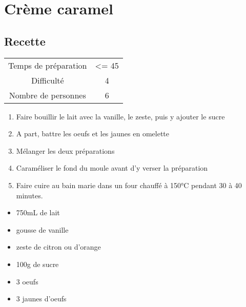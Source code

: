 \newpage
\section{Crème caramel}
    \label{sec:Crème caramel}
    \subsection{Recette}
    \vspace{1cm}


    \begin{center}
        \begin{tabular}{c|c}
            Temps de préparation & <= 45 \\
            Difficulté & 4 \\
            Nombre de personnes & 6 
        \end{tabular}
    \end{center}{}

    \vspace{1cm}
    \hline
    \vspace{1cm}

    \begin{minipage}{.7\textwidth}
        \begin{enumerate}
            \item Faire bouillir le lait avec la vanille, le zeste, puis y ajouter le sucre
	    \item A part, battre les oeufs et les jaunes en omelette
	    \item Mélanger les deux préparations
	    \item Caraméliser le fond du moule avant d'y verser la préparation
	    \item Faire cuire au bain marie dans un four chauffé à 150°C pendant 30 à 40 minutes.

        \end{enumerate}
    \end{minipage}
    \begin{minipage}{.3\textwidth}
        \begin{flushleft}
        \begin{itemize}
            \item 750mL de lait
	    \item gousse de vanille
	    \item zeste de citron ou d'orange
	    \item 100g de sucre
	    \item 3 oeufs
	    \item 3 jaunes d'oeufs

        \end{itemize}
        \end{flushleft}
    \end{minipage}
    

